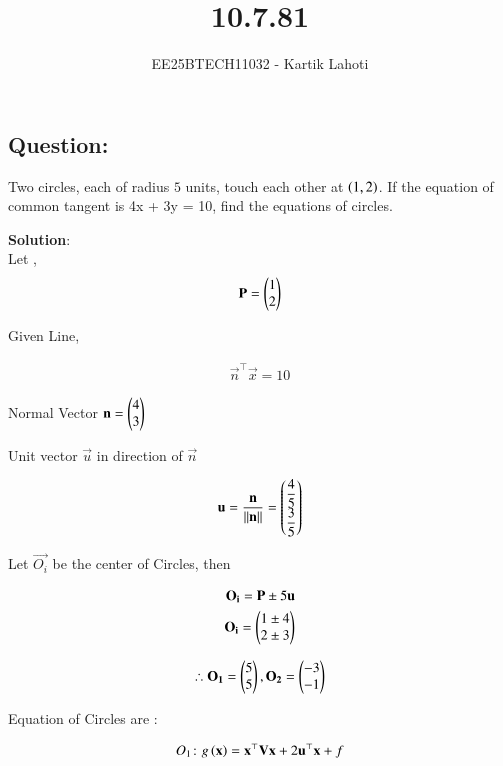 \documentclass[journal]{IEEEtran}
\numberwithin{equation}{enumi}
\numberwithin{figure}{enumi}
\begin{document}

\vspace{3cm}

\title{10.7.81}
\author{EE25BTECH11032 - Kartik Lahoti}
\maketitle

\subsection*{Question: } 
Two circles, each of radius $5$ units, touch each other at $\left(1,2\right)$. If the equation of common tangent is 4x + 3y = 10, find the equations of circles.

\textbf{Solution}:\\

Let , 
\begin{align}
    \mathbf{P} = \begin{pmatrix}1\\2\end{pmatrix}
\end{align}


Given Line, 

\begin{align}
    \vec{n}^{\top}\vec{x} = 10
\end{align}

Normal Vector $\mathbf{n} = \begin{pmatrix}4 \\ 3\end{pmatrix}$

Unit vector $\vec{u}$ in direction of $\vec{n}$

\begin{align}
    \mathbf{u} = \frac{\mathbf{n}}{\left\lVert\mathbf{n}\right\rVert} = \begin{pmatrix}\dfrac{4}{5} \\ \dfrac{3}{5}\end{pmatrix}
\end{align}

Let $\vec{O_i}$ be the center of Circles, then

\begin{align}
    \mathbf{O_i} = \mathbf{P} \pm 5\mathbf{u} \\ 
    \mathbf{O_i} = \begin{pmatrix}1\pm4 \\ 2\pm3\end{pmatrix} 
\end{align} 


\begin{align}
    \therefore \mathbf{O_1} = \begin{pmatrix}5 \\ 5\end{pmatrix} , \mathbf{O_2} = \begin{pmatrix}-3\\-1\end{pmatrix}
\end{align}

Equation of Circles are : 

\begin{align}
    O_1 \colon g\left(\mathbf{x}\right) = \mathbf{x}^{\top}\mathbf{V}\mathbf{x} + 2\mathbf{u}^{\top}\mathbf{x} + f 
\end{align}
\end{document}

